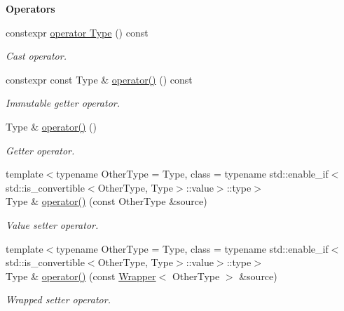 \begin{Indent}{\bf Operators}\par
\begin{DoxyCompactItemize}
\item 
constexpr \hyperlink{exceptionmagrathea_1_1Wrapper_abebe6d1f2cab1515bab0a3039fb0016f}{operator Type} () const 
\begin{DoxyCompactList}\small\item\em Cast operator. \end{DoxyCompactList}\item 
constexpr const Type \& \hyperlink{exceptionmagrathea_1_1Wrapper_a3c41e5eef583c8bd2a0ad76688661020}{operator()} () const 
\begin{DoxyCompactList}\small\item\em Immutable getter operator. \end{DoxyCompactList}\item 
Type \& \hyperlink{exceptionmagrathea_1_1Wrapper_abba58ad18212148111214ebdf6a937a4}{operator()} ()
\begin{DoxyCompactList}\small\item\em Getter operator. \end{DoxyCompactList}\item 
{\footnotesize template$<$typename Other\-Type  = Type, class  = typename std\-::enable\-\_\-if$<$std\-::is\-\_\-convertible$<$\-Other\-Type, Type$>$\-::value$>$\-::type$>$ }\\Type \& \hyperlink{exceptionmagrathea_1_1Wrapper_a7b1b8b2d7387a023e92e902fae62bb25}{operator()} (const Other\-Type \&source)
\begin{DoxyCompactList}\small\item\em Value setter operator. \end{DoxyCompactList}\item 
{\footnotesize template$<$typename Other\-Type  = Type, class  = typename std\-::enable\-\_\-if$<$std\-::is\-\_\-convertible$<$\-Other\-Type, Type$>$\-::value$>$\-::type$>$ }\\Type \& \hyperlink{exceptionmagrathea_1_1Wrapper_a84c659489cad851d1a32173676ec474a}{operator()} (const \hyperlink{exceptionmagrathea_1_1Wrapper}{Wrapper}$<$ Other\-Type $>$ \&source)
\begin{DoxyCompactList}\small\item\em Wrapped setter operator. \end{DoxyCompactList}\end{DoxyCompactItemize}
\end{Indent}
